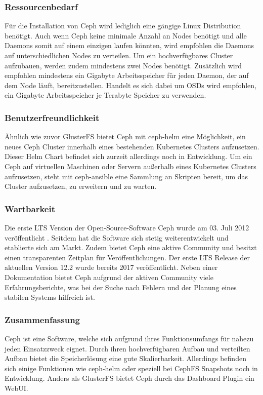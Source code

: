 \subsubsection{Ressourcenbedarf}
Für die Installation von Ceph wird lediglich eine gängige Linux Distribution benötigt. Auch wenn Ceph keine minimale Anzahl an Nodes benötigt und alle Daemons somit auf einem einzigen laufen könnten, wird empfohlen die Daemons auf unterschiedlichen Nodes zu verteilen. Um ein hochverfügbares Cluster aufzubauen, werden zudem mindestens zwei Nodes benötigt.
Zusätzlich wird empfohlen mindestens ein Gigabyte Arbeitsspeicher für jeden Daemon, der auf dem Node läuft, bereitzustellen. Handelt es sich dabei um OSDs wird empfohlen, ein Gigabyte Arbeitsspeicher je Terabyte Speicher zu verwenden.

\subsubsection{Benutzerfreundlichkeit}
Ähnlich wie zuvor GlusterFS bietet Ceph mit ceph-helm eine Möglichkeit, ein neues Ceph Cluster innerhalb eines bestehenden Kubernetes Clusters aufzusetzen. Dieser Helm Chart befindet sich zurzeit allerdings noch in Entwicklung. Um ein Ceph auf virtuellen Maschinen oder Servern außerhalb eines Kubernetes Clusters aufzusetzen, steht mit ceph-ansible eine Sammlung an Skripten bereit, um das Cluster aufzusetzen, zu erweitern und zu warten.

\subsubsection{Wartbarkeit}
Die erste \ac{LTS} Version der Open-Source-Software Ceph wurde am 03. Juli 2012 veröffentlicht \cite{ cephcookbook}. Seitdem hat die Software sich stetig weiterentwickelt und etablierte sich am Markt. Zudem bietet Ceph eine aktive Community \cite{Du2018Cider:Storage} und besitzt einen transparenten Zeitplan für Veröffentlichungen. Der erste \ac{LTS} Release der aktuellen Version 12.2 wurde bereits 2017 veröffentlicht.
Neben einer Dokumentation bietet Ceph aufgrund der aktiven Community viele Erfahrungsberichte, was bei der Suche nach Fehlern und der Planung eines stabilen Systems hilfreich ist.


\subsubsection{Zusammenfassung}
Ceph ist eine Software, welche sich aufgrund ihres Funktionsumfangs für nahezu jeden Einsatzzweck eignet. Durch ihren hochverfügbaren Aufbau und verteilten Aufbau bietet die Speicherlösung eine gute Skalierbarkeit. Allerdings befinden sich einige Funktionen wie ceph-helm oder speziell bei CephFS Snapshots noch in Entwicklung. Anders als GlusterFS bietet Ceph durch das Dashboard Plugin ein WebUI.

